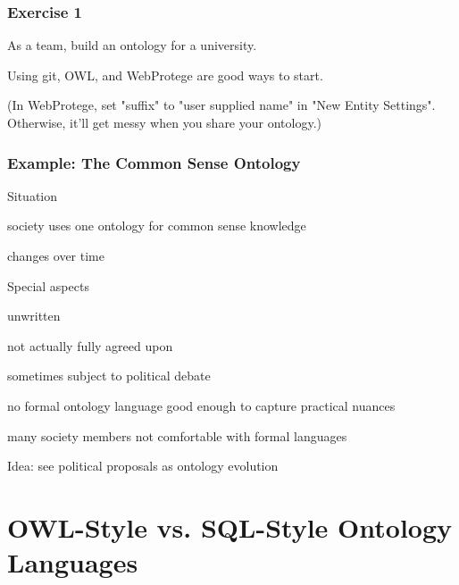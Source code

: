 \begin{frame}\frametitle{Exercise 1}
As a team, build an ontology for a university.

Using git, OWL, and WebProtege are good ways to start.
\bigskip

{\small (In WebProtege, set "suffix" to "user supplied name" in "New Entity Settings". Otherwise, it'll get messy when you share your ontology.)}
\end{frame}

\begin{frame}\frametitle{Example: The Common Sense Ontology}
\begin{blockitems}{Situation}
\item society uses one ontology for common sense knowledge
\item changes over time
\end{blockitems}

\begin{blockitems}{Special aspects}
\item unwritten
\item not actually fully agreed upon
\item sometimes subject to political debate
\item no formal ontology language good enough to capture practical nuances
\item many society members not comfortable with formal languages
\end{blockitems}

Idea: see political proposals as ontology evolution
\end{frame}

\section{OWL-Style vs. SQL-Style Ontology Languages}



